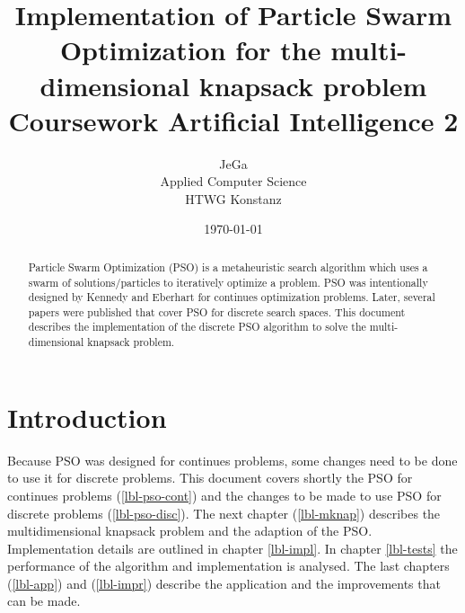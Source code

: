 \documentclass{article}
\begin{document}
\title{Implementation of Particle Swarm Optimization for the multi-dimensional knapsack problem \\
\vspace{2 mm} {\large Coursework Artificial Intelligence 2}}
\author{JeGa\\
        Applied Computer Science\\
		HTWG Konstanz}
\date{\today}
\maketitle

\begin{abstract}
Particle Swarm Optimization (PSO) is a metaheuristic search algorithm which uses a swarm of solutions/particles to iteratively optimize a problem. PSO was intentionally designed by Kennedy and Eberhart \cite{bib-continues} for continues optimization problems. Later, several papers were published that cover PSO for discrete search spaces. This document describes the implementation of the discrete PSO algorithm to solve the multi-dimensional knapsack problem.
\end{abstract}

\newpage
\cfoot[\thepage]{}

\tableofcontents

\newpage

\section{Introduction}
\label{lbl-intro}
Because PSO was designed for continues problems, some changes need to be done to use it for discrete problems. This document covers shortly the PSO for continues problems (\ref{lbl-pso-cont}) and the changes to be made to use PSO for discrete problems (\ref{lbl-pso-disc}). The next chapter (\ref{lbl-mknap}) describes the multidimensional knapsack problem and the adaption of the PSO.
Implementation details are outlined in chapter \ref{lbl-impl}. In chapter \ref{lbl-tests} the performance of the algorithm and implementation is analysed. The last chapters (\ref{lbl-app}) and (\ref{lbl-impr}) describe the application and the improvements that can be made.
\end{document}
